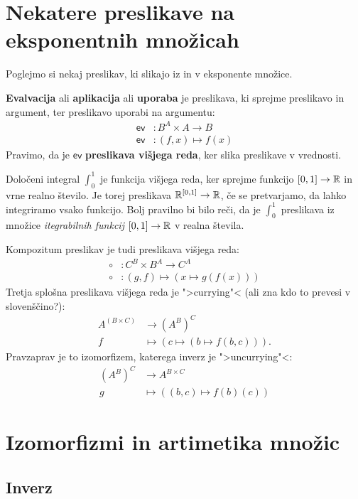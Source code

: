 \section{Nekatere preslikave na eksponentnih množicah}

Poglejmo si nekaj preslikav, ki slikajo iz in v eksponente množice.

\textbf{Evalvacija} ali \textbf{aplikacija} ali \textbf{uporaba} je preslikava, ki sprejme preslikavo in argument, ter preslikavo uporabi na argumentu:
%
\begin{align*}
  \mathsf{ev} &: B^A \times A \to B \\
  \mathsf{ev} &: (f, x) \mapsto f(x)
\end{align*}
%
Pravimo, da je $\mathsf{ev}$ \textbf{preslikava višjega reda}, ker slika preslikave v vrednosti.

\begin{primer}
  Določeni integral $\int_0^1$ je funkcija višjega reda, ker
  sprejme funkcijo $[0,1] \to \mathbb{R}$ in vrne realno število. Je torej preslikava
  $\mathbb{R}^{[0,1]} \to \mathbb{R}$, če se pretvarjamo, da lahko integriramo vsako funkcijo.
  Bolj pravilno bi bilo reči, da je $\int_0^1$ preslikava iz množice \emph{itegrabilnih funkcij $[0,1] \to \mathbb{R}$} v realna števila.
\end{primer}

Kompozitum preslikav je tudi preslikava višjega reda:
%
\begin{align*}
    {\circ} &: C^B \times B^A \to C^A \\
    {\circ} &: (g, f) \mapsto (x \mapsto g(f(x)))
\end{align*}
%
Tretja splošna preslikava višjega reda je ">currying"< (ali zna kdo to prevesi v slovenščino?):
%
\begin{align*}
  A^{(B \times C)} &\to (A^B)^C \\
  f &\mapsto (c \mapsto (b \mapsto f(b, c))).
\end{align*}
%
Pravzaprav je to izomorfizem, katerega inverz je ">uncurrying"<:
%
\begin{align*}
  (A^B)^C &\to A^{B \times C} \\
  g       &\mapsto ((b, c) \mapsto f(b)(c))
\end{align*}


\section{Izomorfizmi in artimetika množic}

\subsection{Inverz}

